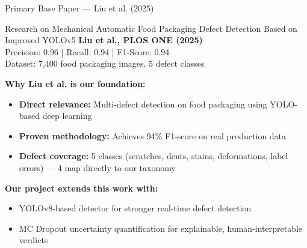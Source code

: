 \documentclass[10pt]{beamer}
\begin{document}
\begin{frame}{Primary Base Paper --- Liu et al. (2025)}

\small
\begin{block}{Research on Mechanical Automatic Food Packaging Defect Detection Based on Improved YOLOv5}
\textbf{Liu et al., PLOS ONE (2025)}\\
Precision: 0.96 | Recall: 0.94 | F1-Score: 0.94\\
Dataset: 7,400 food packaging images, 5 defect classes
\end{block}

\vspace{6pt}
\textbf{Why Liu et al. is our foundation:}
\begin{itemize}\setlength{\itemsep}{3pt}
    \item \textbf{Direct relevance:} Multi-defect detection on food packaging using YOLO-based deep learning
    \item \textbf{Proven methodology:} Achieves 94\% F1-score on real production data
    \item \textbf{Defect coverage:} 5 classes (scratches, dents, stains, deformations, label errors) --- 4 map directly to our taxonomy
\end{itemize}

\vspace{6pt}
\textbf{Our project extends this work with:}
\begin{itemize}\setlength{\itemsep}{2pt}
    \item YOLOv8-based detector for stronger real-time defect detection
    \item MC Dropout uncertainty quantification for explainable, human-interpretable verdicts
\end{itemize}

\end{frame}
\end{document}
